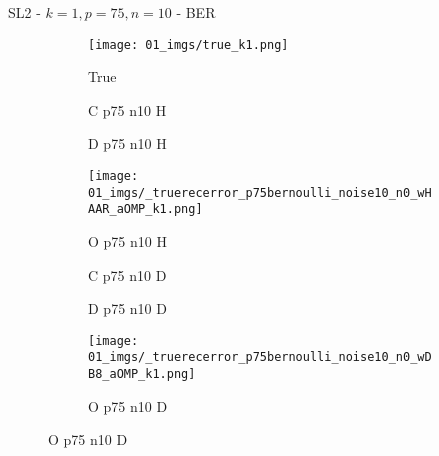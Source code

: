 \begin{frame}{SL2 - $k=1,p=75,n=10$ - BER}{}
\begin{figure}
\begin{subfigure}{0.13\textwidth}
\texttt{[image: 01\_imgs/true\_k1.png]}
\caption*{\tiny True}
\end{subfigure}
\begin{subfigure}{0.13\textwidth}
\caption*{\tiny C p75 n10 H}
\end{subfigure}
\begin{subfigure}{0.13\textwidth}
\caption*{\tiny D p75 n10 H}
\end{subfigure}
\begin{subfigure}{0.13\textwidth}
\texttt{[image: 01\_imgs/\_truerecerror\_p75bernoulli\_noise10\_n0\_wHAAR\_aOMP\_k1.png]}
\caption*{\tiny O p75 n10 H}
\end{subfigure}
\begin{subfigure}{0.13\textwidth}
\caption*{\tiny C p75 n10 D}
\end{subfigure}
\begin{subfigure}{0.13\textwidth}
\caption*{\tiny D p75 n10 D}
\end{subfigure}
\begin{subfigure}{0.13\textwidth}
\texttt{[image: 01\_imgs/\_truerecerror\_p75bernoulli\_noise10\_n0\_wDB8\_aOMP\_k1.png]}
\caption*{\tiny O p75 n10 D}
\end{subfigure}
\end{figure}
\end{frame}

